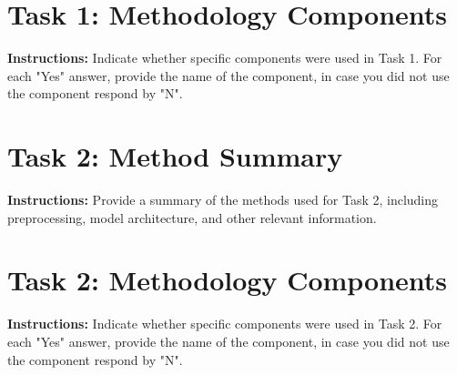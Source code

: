 \documentclass{article}
\begin{document}
\section{Task 1: Methodology Components}
\noindent\textbf{Instructions:} Indicate whether specific components were used in Task 1. For each "Yes" answer, provide the name of the component, in case you did not use the component respond by "N".

\begin{table}[h!]
\centering
{}
\end{table}
\section{Task 2: Method Summary}
\noindent\textbf{Instructions:} Provide a summary of the methods used for Task 2, including preprocessing, model architecture, and other relevant information.

\begin{table}[h!]
\centering
{}
\end{table}

\section{Task 2: Methodology Components}
\noindent\textbf{Instructions:} Indicate whether specific components were used in Task 2. For each "Yes" answer, provide the name of the component, in case you did not use the component respond by "N".
\end{document}
